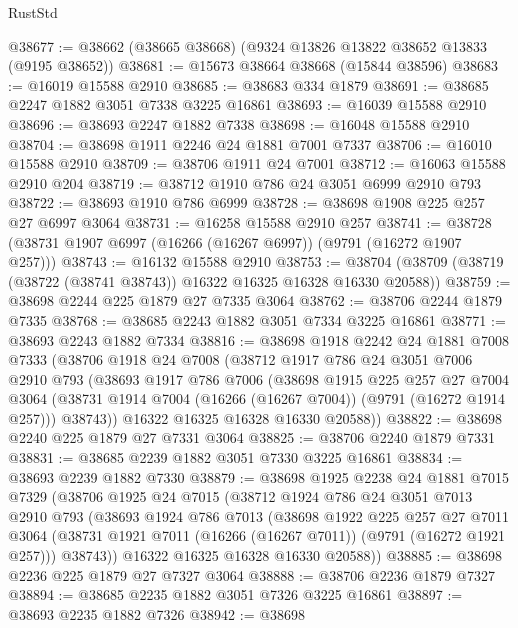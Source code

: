 \begin{lexlean}{RustStd}
\begin{coremodule}
@38677 := @38662 (@38665 @38668) (@9324 @13826 @13822 @38652 @13833 (@9195 @38652))
@38681 := @15673 @38664 @38668 (@15844 @38596)
@38683 := @16019 @15588 @2910
@38685 := @38683 @334 @1879
@38691 := @38685 @2247 @1882 @3051 @7338 @3225 @16861
@38693 := @16039 @15588 @2910
@38696 := @38693 @2247 @1882 @7338
@38698 := @16048 @15588 @2910
@38704 := @38698 @1911 @2246 @24 @1881 @7001 @7337
@38706 := @16010 @15588 @2910
@38709 := @38706 @1911 @24 @7001
@38712 := @16063 @15588 @2910 @204
@38719 := @38712 @1910 @786 @24 @3051 @6999 @2910 @793
@38722 := @38693 @1910 @786 @6999
@38728 := @38698 @1908 @225 @257 @27 @6997 @3064
@38731 := @16258 @15588 @2910 @257
@38741 := @38728 (@38731 @1907 @6997 (@16266 (@16267 @6997)) (@9791 (@16272 @1907 @257)))
@38743 := @16132 @15588 @2910
@38753 := @38704 (@38709 (@38719 (@38722 (@38741 @38743)) @16322 @16325 @16328 @16330 @20588))
@38759 := @38698 @2244 @225 @1879 @27 @7335 @3064
@38762 := @38706 @2244 @1879 @7335
@38768 := @38685 @2243 @1882 @3051 @7334 @3225 @16861
@38771 := @38693 @2243 @1882 @7334
@38816 := @38698
    @1918
    @2242
    @24
    @1881
    @7008
    @7333
    (@38706
      @1918
      @24
      @7008
      (@38712
        @1917
        @786
        @24
        @3051
        @7006
        @2910
        @793
        (@38693
          @1917
          @786
          @7006
          (@38698
            @1915
            @225
            @257
            @27
            @7004
            @3064
            (@38731 @1914 @7004 (@16266 (@16267 @7004)) (@9791 (@16272 @1914 @257)))
            @38743))
        @16322
        @16325
        @16328
        @16330
        @20588))
@38822 := @38698 @2240 @225 @1879 @27 @7331 @3064
@38825 := @38706 @2240 @1879 @7331
@38831 := @38685 @2239 @1882 @3051 @7330 @3225 @16861
@38834 := @38693 @2239 @1882 @7330
@38879 := @38698
    @1925
    @2238
    @24
    @1881
    @7015
    @7329
    (@38706
      @1925
      @24
      @7015
      (@38712
        @1924
        @786
        @24
        @3051
        @7013
        @2910
        @793
        (@38693
          @1924
          @786
          @7013
          (@38698
            @1922
            @225
            @257
            @27
            @7011
            @3064
            (@38731 @1921 @7011 (@16266 (@16267 @7011)) (@9791 (@16272 @1921 @257)))
            @38743))
        @16322
        @16325
        @16328
        @16330
        @20588))
@38885 := @38698 @2236 @225 @1879 @27 @7327 @3064
@38888 := @38706 @2236 @1879 @7327
@38894 := @38685 @2235 @1882 @3051 @7326 @3225 @16861
@38897 := @38693 @2235 @1882 @7326
@38942 := @38698

\end{coremodule}
\end{lexlean}
